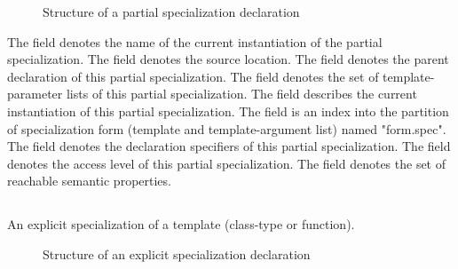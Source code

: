 %
\begin{figure}[H]
	\centering
	\caption{Structure of a partial specialization declaration}
	\label{fig:ifc-partial-specialization-decl-structure}
\end{figure}

The  field denotes the name of the current instantiation of the partial specialization.
The  field denotes the source location.
The  field denotes the parent declaration of this partial specialization.
The  field denotes the set of template-parameter lists of this partial specialization.
The  field describes the current instantiation of this partial specialization.
The  field is an index into the partition of specialization form (template and template-argument list) named "form.spec".
The  field denotes the declaration specifiers of this partial specialization.
The  field denotes the access level of this partial specialization.
The  field denotes the set of reachable semantic properties.



\subsection{} 
\label{sec:ifc:DeclSort:ExplicitSpecialization}

An explicit specialization
of a template (class-type or function). 

\begin{figure}[H]
	\centering
	\caption{Structure of an explicit specialization declaration}
	\label{fig:ifc-explicit-specialization-declaration}
\end{figure}

